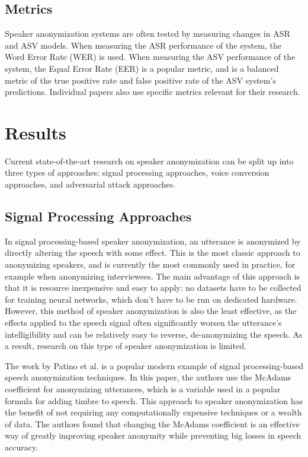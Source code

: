 \documentclass{Interspeech2024}
\begin{document}
\subsection{Metrics}
Speaker anonymization systems are often tested by measuring changes in ASR and ASV models.
When measuring the ASR performance of the system, the Word Error Rate (WER) is used.
When measuring the ASV performance of the system, the Equal Error Rate (EER) is a popular metric, and is a balanced metric of the true positive rate and false positive rate of the ASV system's predictions.
Individual papers also use specific metrics relevant for their research.


\section{Results}
Current state-of-the-art research on speaker anonymization can be split up into three types of approaches: signal processing approaches, voice conversion approaches, and adversarial attack approaches.

\subsection{Signal Processing Approaches}
In signal processing-based speaker anonymization, an utterance is anonymized by directly altering the speech with some effect.
This is the most classic approach to anonymizing speakers, and is currently the most commonly used in practice, for example when anonymizing interviewees.
The main advantage of this approach is that it is resource inexpensive and easy to apply: no datasets have to be collected for training neural networks, which don't have to be run on dedicated hardware.
However, this method of speaker anonymization is also the least effective, as the effects applied to the speech signal often significantly worsen the utterance's intelligibility and can be relatively easy to reverse, de-anonymizing the speech.
As a result, research on this type of speaker anonymization is limited.

The work by Patino et al. \cite{patino_2021_mcadams} is a popular modern example of signal processing-based speech anonymization techniques.
In this paper, the authors use the McAdams coefficient for anonymizing utterances, which is a variable used in a popular formula for adding timbre to speech. 
This approach to speaker anonymization has the benefit of not requiring any computationally expensive techniques or a wealth of data. 
The authors found that changing the McAdams coefficient is an effective way of greatly improving speaker anonymity while preventing big losses in speech accuracy.
\end{document}
